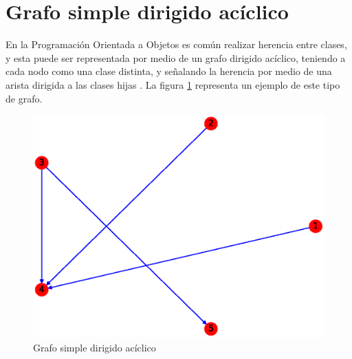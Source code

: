 \documentclass{article}
\begin{document}
\section{Grafo simple dirigido acíclico}
En la Programación Orientada a Objetos es común realizar herencia entre clases, y esta puede ser representada por medio de un grafo dirigido acíclico, teniendo a cada nodo como una clase distinta, y señalando la herencia por medio de una arista dirigida a las clases hijas \cite{GSDA}. La figura \ref{fig:GSDA} representa un ejemplo de este tipo de grafo.
\begin{figure}[H]
    \includegraphics[width=\textwidth]{4-GSDA}
    \caption{Grafo simple dirigido acíclico}
    \label{fig:GSDA}
\end{figure}



\end{document}
